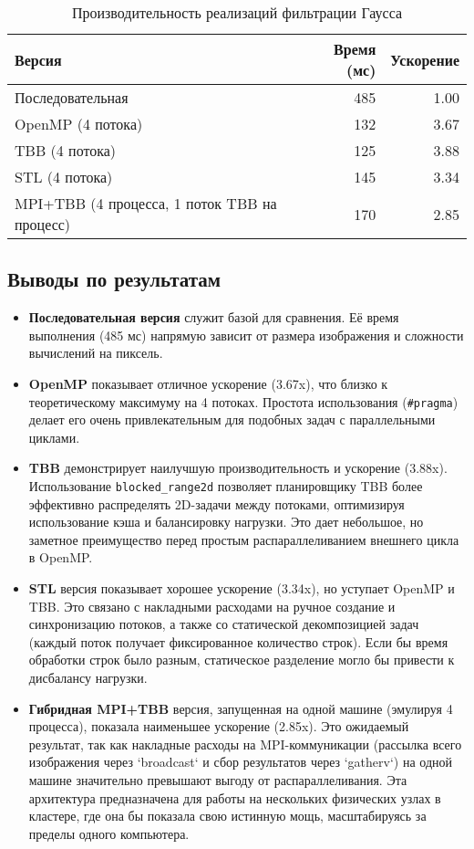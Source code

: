 \documentclass[12pt,a4paper]{extarticle}
\begin{document}
\begin{table}[H]
\centering
\caption{Производительность реализаций фильтрации Гаусса}
\begin{tabular}{lrr}
\toprule
\textbf{Версия} & \textbf{Время (мс)} & \textbf{Ускорение} \\
\midrule
Последовательная & 485 & 1.00 \\
OpenMP (4 потока) & 132 & 3.67 \\
TBB (4 потока) & 125 & 3.88 \\
STL (4 потока) & 145 & 3.34 \\
MPI+TBB (4 процесса, 1 поток TBB на процесс) & 170 & 2.85 \\
\bottomrule
\end{tabular}
\label{tab:performance}
\end{table}

\subsection{Выводы по результатам}
\begin{itemize}
\item \textbf{Последовательная версия} служит базой для сравнения. Её время выполнения (485 мс) напрямую зависит от размера изображения и сложности вычислений на пиксель.
\item \textbf{OpenMP} показывает отличное ускорение (3.67x), что близко к теоретическому максимуму на 4 потоках. Простота использования (\lstinline{#pragma}) делает его очень привлекательным для подобных задач с параллельными циклами.
\item \textbf{TBB} демонстрирует наилучшую производительность и ускорение (3.88x). Использование \lstinline{blocked_range2d} позволяет планировщику TBB более эффективно распределять 2D-задачи между потоками, оптимизируя использование кэша и балансировку нагрузки. Это дает небольшое, но заметное преимущество перед простым распараллеливанием внешнего цикла в OpenMP.
\item \textbf{STL} версия показывает хорошее ускорение (3.34x), но уступает OpenMP и TBB. Это связано с накладными расходами на ручное создание и синхронизацию потоков, а также со статической декомпозицией задач (каждый поток получает фиксированное количество строк). Если бы время обработки строк было разным, статическое разделение могло бы привести к дисбалансу нагрузки.
\item \textbf{Гибридная MPI+TBB} версия, запущенная на одной машине (эмулируя 4 процесса), показала наименьшее ускорение (2.85x). Это ожидаемый результат, так как накладные расходы на MPI-коммуникации (рассылка всего изображения через `broadcast` и сбор результатов через `gatherv`) на одной машине значительно превышают выгоду от распараллеливания. Эта архитектура предназначена для работы на нескольких физических узлах в кластере, где она бы показала свою истинную мощь, масштабируясь за пределы одного компьютера.
\end{itemize}
\end{document}
